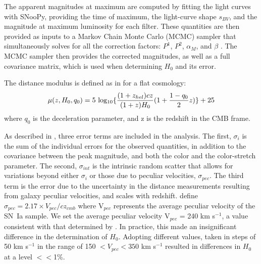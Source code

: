 \documentclass[12pt,modern]{aastex631}
\newcommand{\ho}{$H_{0}$\xspace}
\newcommand{\sn}{SN~Ia\xspace}
\begin{document}
The apparent magnitudes at maximum are computed by fitting the light curves with SNooPy, providing the time of maximum, the light-curve shape $s_{BV}$, and the magnitude at maximum luminosity for each filter. These quantities are then provided as inputs to a Markov Chain Monte Carlo (MCMC) sampler that simultaneously solves for all the correction factors: $P^1$, $P^2$, $\alpha_M$, and $\beta$  \citep[for full details, see][]{burns_2018, uddin_2024}. The MCMC sampler then provides the corrected magnitudes, as well as a full covariance matrix, which is used when determining \ho and its error.

The distance modulus is defined as in \citet{burns_2018} for a flat cosmology:
\begin{equation}
\label{eq:mu}
\mu(z,H_0,q_0) =  {\rm 5~log_{10}} \lbrace  {{(1+z_{hel})} cz \over{{(1+z)}H_0}} (1 + {1-q_0\over{2}}z )\rbrace  + 25
\end{equation} \linebreak
\noindent
where  $q_0$ is the deceleration parameter, and z is the redshift in the CMB frame.

As described in \cite{uddin_2024}, three error terms are included in the analysis. The first, $\sigma_i$ is the sum of the individual errors for the observed quantities, in addition to the covariance between the peak magnitude, and both the color and the color-stretch parameter. The second, $\sigma_{int}$ is the intrinsic random scatter that allows for variations beyond either $\sigma_i$ or those due to peculiar velocities, $\sigma_{pec}$. The third term is the error due to the uncertainty in the distance measurements resulting from galaxy peculiar velocities, and scales with redshift. \cite{burns_2018} define
$\sigma_{pec} =  2.17 \times  V_{pec} / cz_{cmb}$  where V$_{pec}$  represents the average peculiar velocity of the \sn sample.  We set the average peculiar velocity V$_{pec}$ = 240 km s$^{-1}$, a value consistent with that determined by \citet{brout_2022, scolnic_2015, burns_2018}. In practice, this made an insignificant difference in the determination of \ho. Adopting different values, taken in steps of 50 km s$^{-1}$ in the range of 150 $< V_{pec} < 350$ km s$^{-1}$ resulted in differences in \ho at a level $<<$1\%.
\end{document}
